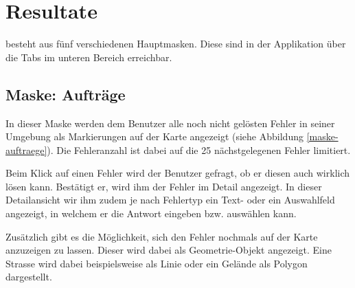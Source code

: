 \section{Resultate}

\kort{} besteht aus fünf verschiedenen Hauptmasken.
Diese sind in der Applikation über die Tabs im unteren Bereich erreichbar.

\subsection{Maske: Aufträge}
In dieser Maske werden dem Benutzer alle noch nicht gelösten Fehler in seiner Umgebung als Markierungen auf der Karte angezeigt (siehe Abbildung \ref{maske-auftraege}).
Die Fehleranzahl ist dabei auf die 25 nächstgelegenen Fehler limitiert.

Beim Klick auf einen Fehler wird der Benutzer gefragt, ob er diesen auch wirklich lösen kann.
Bestätigt er, wird ihm der Fehler im Detail angezeigt.
In dieser Detailansicht wir ihm zudem je nach Fehlertyp ein Text- oder ein Auswahlfeld angezeigt, in welchem er die Antwort eingeben bzw. auswählen kann. 

Zusätzlich gibt es die Möglichkeit, sich den Fehler nochmals auf der Karte anzuzeigen zu lassen.
Dieser wird dabei als Geometrie-Objekt angezeigt.
Eine Strasse wird dabei beispielsweise als Linie oder ein Gelände als Polygon dargestellt.

